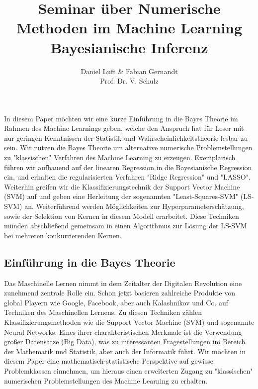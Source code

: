 \documentclass{report}
\theoremstyle{linebreak}
\renewenvironment{abstract}
 {\small
  \begin{center}
  \bfseries \abstractname\vspace{-.5em}\vspace{0pt}
  \end{center}
  \list{}{%
    \setlength{\leftmargin}{12mm}%
    \setlength{\rightmargin}{\leftmargin}%
  }%
  \item\relax}
 {\endlist}
\begin{document}
\title{Seminar über Numerische Methoden im Machine Learning \\ Bayesianische Inferenz}

\author{Daniel Luft & Fabian Gernandt \\ Prof. Dr. V. Schulz}

{}
\begin{abstract}
In diesem Paper möchten wir eine kurze Einführung in die Bayes Theorie im Rahmen des Machine Learnings geben, welche den Anspruch hat für Leser mit nur geringen Kenntnissen der Statistik und Wahrscheinlichkeitstheorie lesbar zu sein. Wir nutzen die Bayes Theorie um alternative numerische Problemstellungen zu "klassischen" Verfahren des Machine Learning zu erzeugen. Exemplarisch führen wir aufbauend auf der linearen Regression in die Bayesianische Regression ein, und erhalten die regularisierten Verfahren "Ridge Regression" und "LASSO". Weiterhin greifen wir die Klassifizierungstechnik der Support Vector Machine (SVM) auf und geben eine Herleitung der sogenannten "Least-Squares-SVM" (LS-SVM) an. Weiterführend werden Möglichkeiten zur Hyperparameterschätzung, sowie der Selektion von Kernen in diesem Modell erarbeitet. Diese Techniken münden abschließend gemeinsam in einen Algorithmus zur Lösung der LS-SVM bei mehreren konkurrierenden Kernen.
\end{abstract}
\vspace{1cm}


\subsection{Einführung in die Bayes Theorie}

Das Maschinelle Lernen nimmt in dem Zeitalter der Digitalen Revolution eine zunehmend zentrale Rolle ein. Schon jetzt basieren zahlreiche Produkte von global Playern wie Google, Facebook, aber auch Kalashnikov und Co. auf Techniken des Maschinellen Lernens. Zu diesen Techniken zählen Klassifizierungsmethoden wie die Support Vector Machine (SVM) und sogenannte Neural Networks. Eines ihrer charakteristischen Merkmale ist die Verwendung großer Datensätze (Big Data), was zu interessanten Fragestellungen im Bereich der Mathematik und Statistik, aber auch der Informatik führt. Wir möchten in diesem Paper eine mathematisch-statistische Perspektive auf gewisse Problemklassen einnehmen, um hieraus einen erweiterten Zugang zu "klassischen" numerischen Problemstellungen des Machine Learning zu erhalten.
\end{document}
